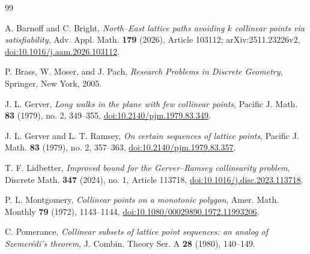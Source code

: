 \documentclass[11pt]{article}
\theoremstyle{definition}
\theoremstyle{remark}
\newcommand{\1}{\mathbf 1}
\begin{document}
\begin{thebibliography}{99}

A. Barnoff and C. Bright, \emph{North--East lattice paths avoiding $k$ collinear points via satisfiability}, Adv. Appl. Math. \textbf{179} (2026), Article 103112; arXiv:2511.23226v2, \href{https://doi.org/10.1016/j.aam.2026.103112}{doi:10.1016/j.aam.2026.103112}.

P. Brass, W. Moser, and J. Pach, \emph{Research Problems in Discrete Geometry}, Springer, New York, 2005.

J. L. Gerver, \emph{Long walks in the plane with few collinear points}, Pacific J. Math. \textbf{83} (1979), no. 2, 349--355, \href{https://doi.org/10.2140/pjm.1979.83.349}{doi:10.2140/pjm.1979.83.349}.

J. L. Gerver and L. T. Ramsey, \emph{On certain sequences of lattice points}, Pacific J. Math. \textbf{83} (1979), no. 2, 357--363, \href{https://doi.org/10.2140/pjm.1979.83.357}{doi:10.2140/pjm.1979.83.357}.

T. F. Lidbetter, \emph{Improved bound for the Gerver--Ramsey collinearity problem}, Discrete Math. \textbf{347} (2024), no. 1, Article 113718, \href{https://doi.org/10.1016/j.disc.2023.113718}{doi:10.1016/j.disc.2023.113718}.

P. L. Montgomery, \emph{Collinear points on a monotonic polygon}, Amer. Math. Monthly \textbf{79} (1972), 1143--1144, \href{https://doi.org/10.1080/00029890.1972.11993206}{doi:10.1080/00029890.1972.11993206}.

C. Pomerance, \emph{Collinear subsets of lattice point sequences: an analog of Szemer\'edi's theorem}, J. Combin. Theory Ser. A \textbf{28} (1980), 140--149.

\end{thebibliography}
\end{document}
